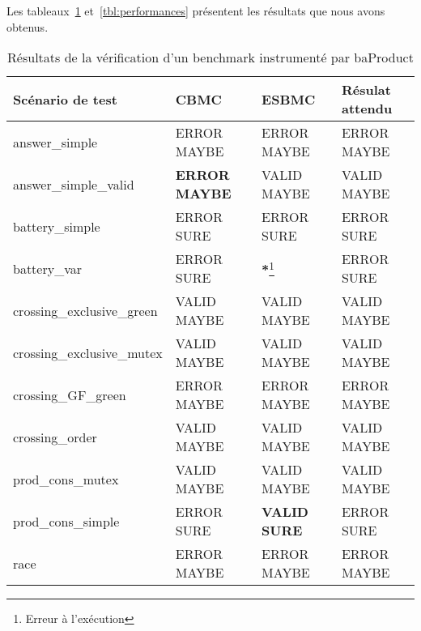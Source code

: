 Les tableaux~\ref{tbl:resultats} et~\ref{tbl:performances} présentent les
résultats que nous avons obtenus.

\begin{table}[tbp]
\centering
\caption{Résultats de la vérification d'un benchmark instrumenté par baProduct}
\label{tbl:resultats}
\begin{tabular}{|l|l|l|l|}
\hline
Scénario de test           & CBMC                 & ESBMC            & Résulat attendu \\
\hline
answer\_simple             & ERROR MAYBE          & ERROR MAYBE      & ERROR MAYBE     \\
answer\_simple\_valid      & \textbf{ERROR MAYBE} & VALID MAYBE      & VALID MAYBE     \\
battery\_simple            & ERROR SURE           & ERROR SURE       & ERROR SURE      \\
battery\_var               & ERROR SURE           & \textbf{*}\footnote{Erreur à l'exécution}& ERROR SURE      \\
crossing\_exclusive\_green & VALID MAYBE          & VALID MAYBE      & VALID MAYBE     \\
crossing\_exclusive\_mutex & VALID MAYBE          & VALID MAYBE      & VALID MAYBE     \\
crossing\_GF\_green        & ERROR MAYBE          & ERROR MAYBE      & ERROR MAYBE     \\
crossing\_order            & VALID MAYBE          & VALID MAYBE      & VALID MAYBE     \\
prod\_cons\_mutex          & VALID MAYBE          & VALID MAYBE      & VALID MAYBE     \\
prod\_cons\_simple         & ERROR SURE           & \textbf{VALID SURE} & ERROR SURE      \\
race                       & ERROR MAYBE          & ERROR MAYBE      & ERROR MAYBE     \\
\hline
\end{tabular}
\end{table}

